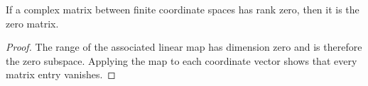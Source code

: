\begin{lemma}
	\label{lem:matrix-rank-zero}
	\leanok
	If a complex matrix between finite coordinate spaces has rank zero, then it
	is the zero matrix.
\end{lemma}
\begin{proof}
	\leanok
	The range of the associated linear map has dimension zero and is therefore
	the zero subspace. Applying the map to each coordinate vector shows that every
	matrix entry vanishes.
\end{proof}
